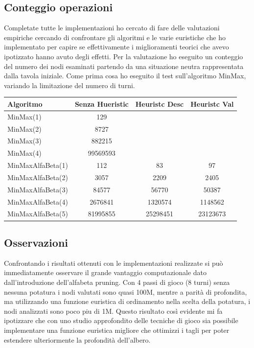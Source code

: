 \documentclass[paper=a4, fontsize=11pt]{scrartcl}	%
\numberwithin{equation}{section}															%
\numberwithin{figure}{section}																%
\numberwithin{table}{section}																%
\begin{document}
\subsection{Conteggio operazioni}
Completate tutte le implementazioni ho cercato di fare delle valutazioni empiriche cercando di confrontare gli algoritmi e le varie euristiche che ho implementato per capire se effettivamente i miglioramenti teorici che avevo ipotizzato hanno avuto degli effetti.
Per la valutazione ho eseguito un conteggio del numero dei nodi esaminati partendo da una situazione neutra rappresentata dalla tavola iniziale. Come prima cosa ho eseguito il test sull'algoritmo MinMax, variando la limitazione del numero di turni.
\begin{table} [h]
    \begin{tabular}{lccc}
        \hline
        Algoritmo & Senza Hueristic & Heuristc Desc\footnotemark[1] & Heuristc Val\footnotemark[2]\\ \hline
        MinMax(1) & 129 & ~ & ~ \\ 
        MinMax(2) & 8727 & ~ & ~ \\ 
        MinMax(3) & 882215 & ~ & ~ \\ 
        MinMax(4) & 99569593 & ~ & ~ \\ 
        MinMaxAlfaBeta(1) & 112 & 83 & 97 \\ 
        MinMaxAlfaBeta(2) & 3057 & 2209 & 2405 \\ 
        MinMaxAlfaBeta(3) & 84577 & 56770 & 50387 \\ 
        MinMaxAlfaBeta(4) & 2676841 & 1320574 & 1148562 \\ 
        MinMaxAlfaBeta(5) & 81995855 & 25298451 & 23123673\\ 
        \hline


    \end{tabular}
\end{table}

\subsection{Osservazioni}
Confrontando i risultati ottenuti con le implementazioni realizzate si pu\`o immediatamente osservare il grande vantaggio computazionale dato dall'introduzione dell'alfabeta pruning. Con 4 passi di gioco (8 turni) senza nessuna potatura i nodi valutati sono quasi 100M, mentre a parit\`a di profondita, ma utilizzando una funzione euristica di ordinamento nella scelta della potatura, i nodi analizzati sono poco piu di 1M. Questo risultato cos\`i evidente mi fa ipotizzare che con uno studio approfondito delle tecniche di gioco sia possibile implementare una funzione euristica migliore che ottimizzi i tagli per poter estendere ulteriormente la profondit\`a dell'albero.
\newpage
\end{document}
